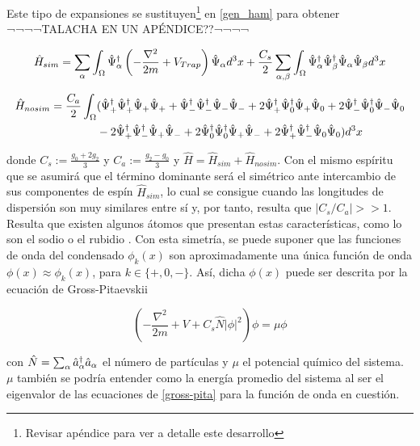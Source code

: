 Este tipo de expansiones se sustituyen\footnote{Revisar apéndice \cite{talacha} para ver a detalle este desarrollo} en \ref{gen_ham} para obtener ¬¬¬¬TALACHA EN UN APÉNDICE??¬¬¬¬

\begin{equation}
\hat{H}_{sim} = \sum_{\alpha} \int_{\Omega} \hat{\Psi}^{\dagger}_\alpha \left( -\frac{\nabla^2}{2m} + V_{Trap} \right) \hat{\Psi}_{\alpha} d^3x + \frac{C_s}{2}\sum_{\alpha,\beta}\int_{\Omega} \hat{\Psi}^{\dagger}_\alpha\hat{\Psi}^{\dagger}_\beta\hat{\Psi}_{\alpha}\hat{\Psi}_{\beta} d^3x
\label{h_sym}
\end{equation}

\begin{equation}
\begin{split}
\hat{H}_{nosim}  = \frac{C_a}{2} \int_{\Omega} & ( \hat{\Psi}^{\dagger}_+\hat{\Psi}^{\dagger}_+\hat{\Psi}_{+}\hat{\Psi}_{+} + 
\hat{\Psi}^{\dagger}_-\hat{\Psi}^{\dagger}_-\hat{\Psi}_{-}\hat{\Psi}_{-} + 2\hat{\Psi}^{\dagger}_+\hat{\Psi}^{\dagger}_0\hat{\Psi}_{+}\hat{\Psi}_{0} + 2\hat{\Psi}^{\dagger}_-\hat{\Psi}^{\dagger}_0\hat{\Psi}_{-}\hat{\Psi}_{0} \\
& - 2\hat{\Psi}^{\dagger}_+\hat{\Psi}^{\dagger}_-\hat{\Psi}_{+}\hat{\Psi}_{-} + 2\hat{\Psi}^{\dagger}_0\hat{\Psi}^{\dagger}_0\hat{\Psi}_{+}\hat{\Psi}_{-} + 2\hat{\Psi}^{\dagger}_+\hat{\Psi}^{\dagger}_-\hat{\Psi}_{0}\hat{\Psi}_{0} ) d^3x
\end{split}
\label{h_nosym}
\end{equation}

donde $C_s := \frac{g_0 + 2g_2}{3}$ y $C_a := \frac{g_2 - g_0}{3}$ y $\hat{H} = \hat{H}_{sim} + \hat{H}_{nosim}$. Con el mismo espíritu que \cite{law98} se asumirá que el término dominante será el simétrico ante intercambio de sus componentes de espín $\hat{H}_{sim}$, lo cual se consigue cuando las longitudes de dispersión son muy similares entre sí y, por tanto, resulta que $|C_s/C_a| >> 1$. Resulta que existen algunos átomos que presentan estas características, como lo son el sodio o el rubidio \cite{sim_scatt_length}. Con esta simetría, se puede suponer que las funciones de onda del condensado $\phi_k(x)$ son aproximadamente una única función de onda $\phi(x) \approx \phi_k(x)$, para $k \in \{ +,0,- \}$. Así, dicha $\phi(x)$ puede ser descrita por la ecuación de Gross-Pitaevskii

\begin{equation}
\left(-\frac{\nabla^2}{2m} + V + C_s\hat{N}|\phi|^2 \right)\phi = \mu \phi
\label{gross-pita}
\end{equation}

con $\hat{N}= \sum_\alpha \hat{a}_{\alpha}^{\dagger} \hat{a}_{\alpha}$ el número de partículas y $\mu$ el potencial químico del sistema. $\mu$ también se podría entender como la energía promedio del sistema al ser el eigenvalor de las ecuaciones de \ref{gross-pita} para la función de onda en cuestión. 


